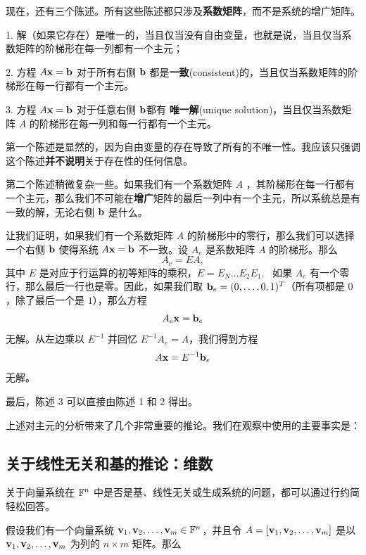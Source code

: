 现在，还有三个陈述。所有这些陈述都只涉及\textbf{系数矩阵}，而不是系统的增广矩阵。

1. 解（如果它存在）是唯一的，当且仅当没有自由变量，也就是说，当且仅当系数矩阵的阶梯形在每一列都有一个主元；

2. 方程 $A \mathbf{x} = \mathbf{b}$ 对于所有右侧 $\mathbf{b}$ 都是\textbf{一致}(consistent)的，当且仅当系数矩阵的阶梯形在每一行都有一个主元。

3. 方程 $A \mathbf{x} = \mathbf{b}$ 对于任意右侧 $\mathbf{b}$都有 \textbf{唯一解}(unique solution)，当且仅当系数矩阵 $A$ 的阶梯形在每一列和每一行都有一个主元。

第一个陈述是显然的，因为自由变量的存在导致了所有的不唯一性。我应该只强调这个陈述\textbf{并不说明}关于存在性的任何信息。

第二个陈述稍微复杂一些。如果我们有一个系数矩阵 $A$ ，其阶梯形在每一行都有一个主元，那么我们不可能在\textbf{增广}矩阵的最后一列中有一个主元，所以系统总是有一致的解，无论右侧 $\mathbf{b}$ 是什么。

让我们证明，如果我们有一个系数矩阵 $A$ 的阶梯形中的零行，那么我们可以选择一个右侧 $\mathbf{b}$ 使得系统 $A \mathbf{x} = \mathbf{b}$ 不一致。设 $A_e$ 是系数矩阵 $A$ 的阶梯形。那么
$$A_e = EA,$$
其中 $E$ 是对应于行运算的初等矩阵的乘积，$E = E_N \dots E_2 E_1$. ~如果 $A_e$ 有一个零行，那么最后一行也是零。因此，如果我们取 $\mathbf{b}_e = (0, \dots, 0, 1)^T$（所有项都是 $0$，除了最后一个是 $1$），那么方程
$$A_e \mathbf{x} = \mathbf{b}_e$$
无解。从左边乘以 $E^{-1}$ 并回忆 $E^{-1} A_e = A$，我们得到方程
$$A \mathbf{x} = E^{-1} \mathbf{b}_e$$
无解。

最后，陈述 3 可以直接由陈述 1 和 2 得出。

上述对主元的分析带来了几个非常重要的推论。我们在观察中使用的主要事实是：


\subsection{关于线性无关和基的推论：维数}\label{sec:02-03-01}

关于向量系统在 $\mathbb{F}^n$ 中是否是基、线性无关或生成系统的问题，都可以通过行约简轻松回答。

\begin{proposition}\label{stmt:02-03-01}
假设我们有一个向量系统 $\mathbf{v}_1, \mathbf{v}_2, \dots, \mathbf{v}_m \in \mathbb{F}^n$，并且令 $A = [\mathbf{v}_1, \mathbf{v}_2, \dots, \mathbf{v}_m]$ 是以 $\mathbf{v}_1, \mathbf{v}_2, \dots, \mathbf{v}_m$ 为列的 $n \times m$ 矩阵。那么
\end{proposition}

